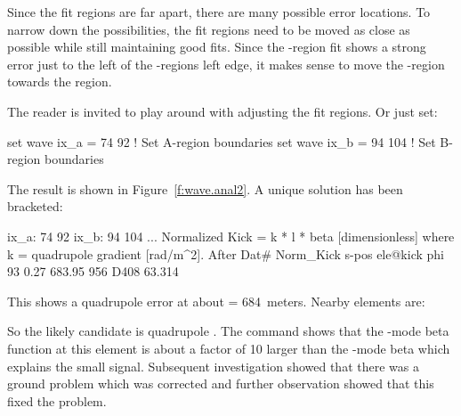 \documentclass{hitec}     %
\begin{document}
Since the fit regions are far apart, there are many possible error locations. To narrow down the
possibilities, the fit regions need to be moved as close as possible while still maintaining good
fits. Since the -region fit shows a strong error just to the left of the -regions left
edge, it makes sense to move the -region towards the  region.

The reader is invited to play around with adjusting the fit regions. Or just set:
\begin{code}
set wave ix_a = 74 92    ! Set A-region boundaries
set wave ix_b = 94 104   ! Set B-region boundaries
\end{code}
The result is shown in Figure~\ref{f:wave.anal2}. A unique solution has been bracketed:
\begin{code}
ix_a:  74  92
ix_b:  94 104
...
Normalized Kick = k * l * beta [dimensionless]
   where k = quadrupole gradient [rad/m^2].
After Dat#    Norm_Kick     s-pos   ele@kick                    phi
       93          0.27    683.95   956   D408                 63.314
\end{code}
This shows a quadrupole error at about  = 684~meters. Nearby elements are:
So the likely candidate is quadrupole . The  command shows that the
-mode beta function at this element is about a factor of 10 larger than the -mode beta
which explains the small  signal. Subsequent investigation showed that there was a
ground problem which was corrected and further observation showed that this fixed the problem.
\end{document}
